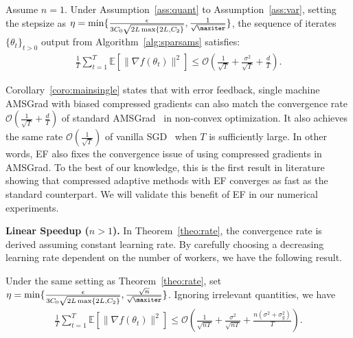 \documentclass[11pt]{article}
\begin{document}
\begin{Corollary}\label{coro:mainsingle}
Assume $n=1$. Under Assumption~\ref{ass:quant} to Assumption~\ref{ass:var}, setting the stepsize as $\eta = \min\{\frac{\epsilon}{3C_0\sqrt{2L \max\{2L,C_2\}}}, \frac{1}{\sqrt{\maxiter}}\}$, the sequence of iterates $\{\theta_t\}_{t>0}$ output from Algorithm~\ref{alg:sparsams} satisfies:
\begin{align*}
    \frac{1}{T}\sum_{t=1}^T \mathbb E[\|\nabla f(\theta_t)\|^2]\leq \mathcal O(\frac{1}{\sqrt{T}}+ \frac{\sigma^2}{\sqrt T}+\frac{d}{T}).
\end{align*}
\end{Corollary}

Corollary~\ref{coro:mainsingle} states that with error feedback, single machine AMSGrad with biased compressed gradients can also match the convergence rate $\mathcal O(\frac{1}{\sqrt{T}}+\frac{d}{T})$ of standard AMSGrad~\cite{Arxiv:Zhou_18} in non-convex optimization. It also achieves the same rate $\mathcal O(\frac{1}{\sqrt T})$ of vanilla SGD~\cite{karimireddy2019error} when $T$ is sufficiently large. In other words, EF also fixes the convergence issue of using compressed gradients in AMSGrad. To the best of our knowledge, this is the first result in literature showing that compressed adaptive methods with EF converges as fast as the standard counterpart. We will validate this benefit of EF in our numerical experiments.

\textbf{Linear Speedup ($n>1$).} In Theorem~\ref{theo:rate}, the convergence rate is derived assuming constant learning rate. By carefully choosing a decreasing learning rate dependent on the number of workers, we have the following result.

\begin{Corollary}\label{coro:linear speedup}
Under the same setting as Theorem~\ref{theo:rate}, set $\eta = \min\{\frac{\epsilon}{3C_0\sqrt{2L \max\{2L,C_2\}}}, \frac{\sqrt n}{\sqrt{\maxiter}}\}$. Ignoring irrelevant quantities, we have
\begin{align}
    \frac{1}{T}\sum_{t=1}^T \mathbb E[\|\nabla f(\theta_t)\|^2]\leq \mathcal O(\frac{1}{\sqrt{nT}}+\frac{\sigma^2}{\sqrt{nT}}+\frac{n(\sigma^2+\sigma_g^2)}{T}).  \label{label:eq:linear speedup}
\end{align}
\end{Corollary}
\end{document}
